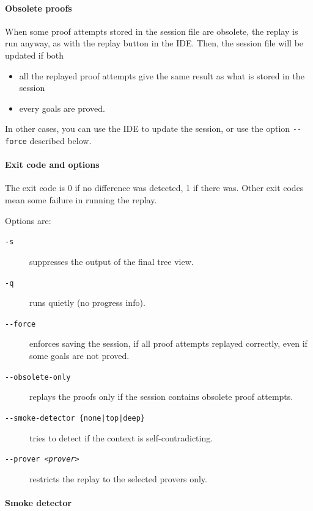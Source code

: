\paragraph{Obsolete proofs}

When some proof attempts stored in the session file are
obsolete,
the replay is run anyway, as with the replay button in the IDE. Then, the session
file will be updated if both
\begin{itemize}
\item all the replayed proof attempts give the same result as what
  is stored in the session
\item every goals are proved.
\end{itemize}
In other cases, you can use the IDE to update the session, or use the
option \verb|--force| described below.

\paragraph{Exit code and options}

The exit code is 0 if no difference was detected, 1 if there
was. Other exit codes mean some failure in running the replay.

Options are:
\begin{description}
\item[\texttt{-s}] suppresses the output of the final tree view.
\item[\texttt{-q}] runs quietly (no progress info).
\item[\texttt{-{}-force}] enforces saving the session, if all proof
  attempts replayed correctly, even if some goals are not proved.
\item[\texttt{-{}-obsolete-only}] replays the proofs only if the session
  contains obsolete proof attempts.
\item[\texttt{-{}-smoke-detector \{none|top|deep\}}] tries to detect
  if the context is self-contradicting.
\item[\texttt{-{}-prover \textsl{<prover>}}] restricts the replay to the
  selected provers only.
\end{description}

\paragraph{Smoke detector}


